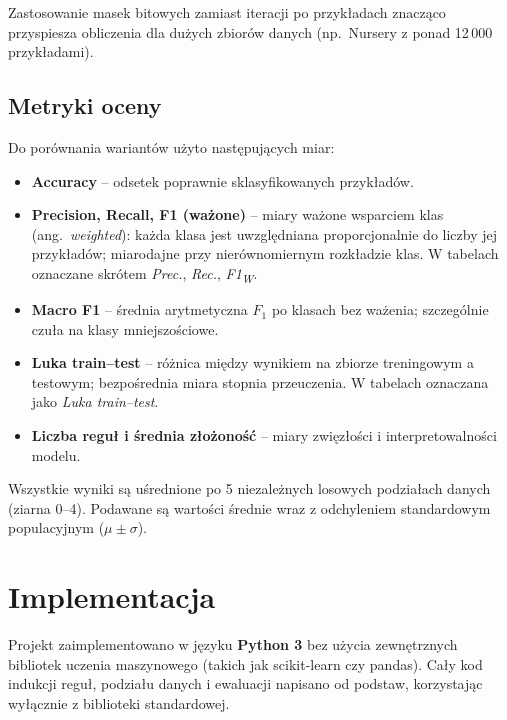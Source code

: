 \documentclass[12pt,a4paper]{article}
\begin{document}
Zastosowanie masek bitowych zamiast iteracji po przykładach znacząco przyspiesza
obliczenia dla dużych zbiorów danych (np.\ Nursery z ponad 12\,000 przykładami).

\subsection{Metryki oceny}
\label{sec:metryki}

Do porównania wariantów użyto następujących miar:

\begin{itemize}
  \item \textbf{Accuracy} -- odsetek poprawnie sklasyfikowanych przykładów.
  \item \textbf{Precision, Recall, F1 (ważone)} -- miary ważone wsparciem klas
        (ang.\ \emph{weighted}): każda klasa jest uwzględniana proporcjonalnie
        do liczby jej przykładów; miarodajne przy nierównomiernym rozkładzie klas.
        W tabelach oznaczane skrótem \emph{Prec.}, \emph{Rec.}, \emph{F1\textsubscript{W}}.
  \item \textbf{Macro F1} -- średnia arytmetyczna $F_1$ po klasach bez ważenia;
        szczególnie czuła na klasy mniejszościowe.
  \item \textbf{Luka train--test} -- różnica między wynikiem
        na zbiorze treningowym a testowym; bezpośrednia miara stopnia przeuczenia.
        W tabelach oznaczana jako \emph{Luka train--test}.
  \item \textbf{Liczba reguł i średnia złożoność} -- miary zwięzłości i
        interpretowalności modelu.
\end{itemize}

Wszystkie wyniki są uśrednione po 5 niezależnych losowych podziałach danych
(ziarna 0--4). Podawane są wartości średnie wraz z odchyleniem standardowym
populacyjnym ($\mu \pm \sigma$).

\section{Implementacja}

Projekt zaimplementowano w języku \textbf{Python 3} bez użycia zewnętrznych
bibliotek uczenia maszynowego (takich jak scikit-learn czy pandas).
Cały kod indukcji reguł, podziału danych i ewaluacji napisano od podstaw,
korzystając wyłącznie z biblioteki standardowej.
\end{document}
